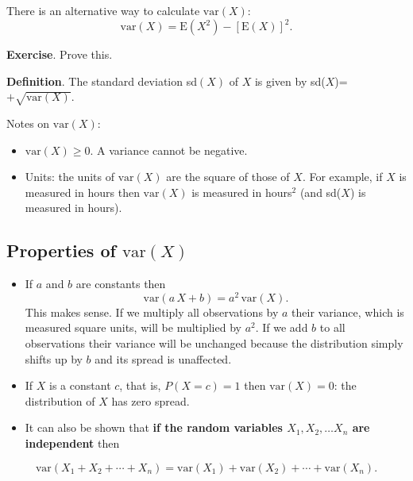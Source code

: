 \documentclass[
  british,
]{book}
\providecommand{\tightlist}{%
  \setlength{\itemsep}{0pt}\setlength{\parskip}{0pt}}
\begin{document}
There is an alternative way to calculate \(\mathrm{var}(X)\):
\[ \mathrm{var}(X) = \mathrm{E}\left(X^2\right) - [\mathrm{E}(X)]^2. \]

\textbf{Exercise}. Prove this.

\textbf{Definition}. The standard deviation sd\((X)\) of \(X\) is given by sd(\(X\))=\(+\sqrt{\mathrm{var}(X)}\).

Notes on \(\mathrm{var}(X)\):

\begin{itemize}
\tightlist
\item
  \(\mathrm{var}(X) \geq 0\). A variance cannot be negative.\\
\item
  Units: the units of \(\mathrm{var}(X)\) are the square of those of \(X\). For example, if \(X\) is measured in hours then \(\mathrm{var}(X)\) is measured in hours\(^2\) (and sd(\(X\)) is measured in hours).
\end{itemize}

\hypertarget{properties-of-mathrmvarx}{%
\subsection{\texorpdfstring{Properties of \(\mathrm{var}(X)\)}{Properties of \textbackslash mathrm\{var\}(X)}}\label{properties-of-mathrmvarx}}

\begin{itemize}
\tightlist
\item
  If \(a\) and \(b\) are constants then
  \[ \mathrm{var}(a\,X+b) = a^2\,\mathrm{var}(X). \]
  This makes sense. If we multiply all observations by \(a\) their variance, which is measured square units, will be multiplied by \(a^2\). If we add \(b\) to all observations their variance will be unchanged because the distribution simply shifts up by \(b\) and its spread is unaffected.
\item
  If \(X\) is a constant \(c\), that is, \(P(X=c)=1\) then \(\mathrm{var}(X)=0\): the distribution of \(X\) has zero spread.
\item
  It can also be shown that \textbf{if the random variables \(X_1, X_2, \ldots X_n\) are independent} then
\end{itemize}

\begin{equation}
\mathrm{var}(X_1 + X_2 + \cdots + X_n) = \mathrm{var}(X_1) + \mathrm{var}(X_2) + \cdots + \mathrm{var}(X_n). 
\label{eq:varsum}
\end{equation}
\end{document}
